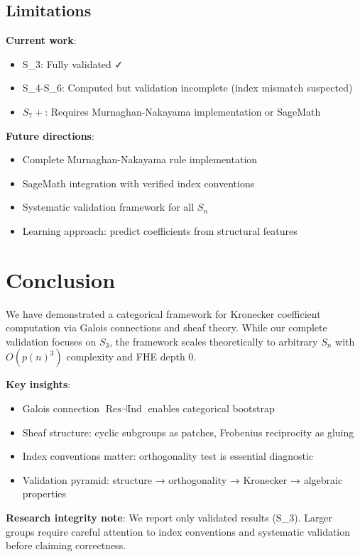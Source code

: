 \documentclass[11pt]{article}
\theoremstyle{definition}
\theoremstyle{remark}
\begin{document}
\subsection{Limitations}

\textbf{Current work}:
\begin{itemize}
\item S_3: Fully validated ✓
\item S_4-S_6: Computed but validation incomplete (index mismatch suspected)
\item $S_7+$: Requires Murnaghan-Nakayama implementation or SageMath
\end{itemize}

\textbf{Future directions}:
\begin{itemize}
\item Complete Murnaghan-Nakayama rule implementation
\item SageMath integration with verified index conventions
\item Systematic validation framework for all $S_n$
\item Learning approach: predict coefficients from structural features
\end{itemize}

\section{Conclusion}

We have demonstrated a categorical framework for Kronecker coefficient computation via Galois connections and sheaf theory. While our complete validation focuses on $S_3$, the framework scales theoretically to arbitrary $S_n$ with $O(p(n)^3)$ complexity and FHE depth 0.

\textbf{Key insights}:
\begin{itemize}
\item Galois connection $\text{Res} \dashv \text{Ind}$ enables categorical bootstrap
\item Sheaf structure: cyclic subgroups as patches, Frobenius reciprocity as gluing
\item Index conventions matter: orthogonality test is essential diagnostic
\item Validation pyramid: structure → orthogonality → Kronecker → algebraic properties
\end{itemize}

\textbf{Research integrity note}: We report only validated results (S_3). Larger groups require careful attention to index conventions and systematic validation before claiming correctness.
\end{document}
